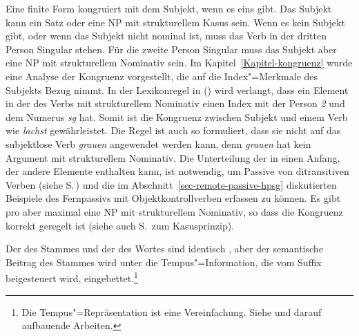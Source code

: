 Eine finite Form kongruiert mit dem Subjekt, wenn es eins gibt. Das Subjekt kann ein Satz oder eine
NP mit strukturellem Kasus sein. Wenn es kein Subjekt gibt, oder wenn das Subjekt nicht nominal ist,
muss das Verb in der dritten Person Singular stehen. Für die zweite Person Singular muss das Subjekt
aber eine NP mit strukturellem Nominativ sein.
Im Kapitel~\ref{Kapitel-kongruenz}
wurde eine Analyse der Kongruenz vorgestellt, die auf die Index"=Merkmale des Subjekts Bezug nimmt.
In der Lexikonregel in () wird verlangt, dass ein Element in der \argstl des Verbs mit
strukturellem Nominativ einen Index mit der Person \emph{2} und dem Numerus \emph{sg} hat.
Somit ist die Kongruenz zwischen Subjekt und einem Verb wie \emph{lachst} gewährleistet. Die Regel
ist auch so formuliert, dass sie nicht auf das subjektlose Verb \emph{grauen} angewendet werden kann,
denn \emph{grauen} hat kein Argument mit strukturellem Nominativ. Die Unterteilung der \argstl in einen
Anfang, der andere Elemente enthalten kann, ist notwendig, um Passive von ditransitiven Verben
(siehe S.\,\pageref{ex-dass dem Kind der Roman geschenkt wurde-Passiv}) und
die im Abschnitt~\ref{sec-remote-passive-hpsg} diskutierten Beispiele des
Fernpassivs mit Objektkontrollverben erfassen zu
können. Es gibt pro \argstl aber maximal eine NP mit strukturellem Nominativ, so dass die Kongruenz
korrekt geregelt ist (siehe auch S.\,\pageref{Kasusprinzip} zum Kasusprinzip).%
%
\largerpage

Der \catw des Stammes und der \catw des Wortes sind identisch , aber der semantische
Beitrag des Stammes wird unter die Tempus"=Information, die vom Suffix beigesteuert wird,
eingebettet.\footnote{ 
  Die Tempus"=Repräsentation ist eine Vereinfachung. Siehe  und darauf
  aufbauende Arbeiten.%
}

